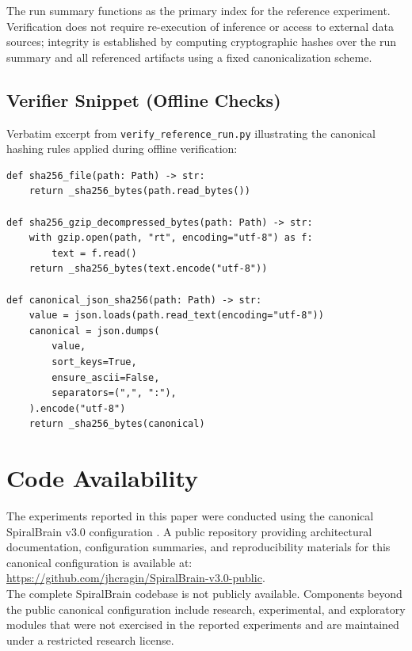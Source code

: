 \documentclass[12pt,a4paper]{article}
\begin{document}
\medskip
\noindent
The run summary functions as the primary index for the reference experiment. Verification does not require re-execution of inference or access to external data sources; integrity is established by computing cryptographic hashes over the run summary and all referenced artifacts using a fixed canonicalization scheme.

\subsection{Verifier Snippet (Offline Checks)}

Verbatim excerpt from \texttt{verify\_reference\_run.py} illustrating the canonical hashing rules applied during offline verification:

\begin{Verbatim}[fontsize=\small,breaklines=true,breakanywhere=true]
def sha256_file(path: Path) -> str:
    return _sha256_bytes(path.read_bytes())

def sha256_gzip_decompressed_bytes(path: Path) -> str:
    with gzip.open(path, "rt", encoding="utf-8") as f:
        text = f.read()
    return _sha256_bytes(text.encode("utf-8"))

def canonical_json_sha256(path: Path) -> str:
    value = json.loads(path.read_text(encoding="utf-8"))
    canonical = json.dumps(
        value,
        sort_keys=True,
        ensure_ascii=False,
        separators=(",", ":"),
    ).encode("utf-8")
    return _sha256_bytes(canonical)
\end{Verbatim}



\section{Code Availability}

The experiments reported in this paper were conducted using the canonical SpiralBrain v3.0 configuration \cite{SpiralBrainV3}.
A public repository providing architectural documentation, configuration summaries, and reproducibility materials for this canonical configuration is available at: \\
\url{https://github.com/jhcragin/SpiralBrain-v3.0-public}. \\

The complete SpiralBrain codebase is not publicly available. Components beyond the public canonical configuration include research, experimental, and exploratory modules that were not exercised in the reported experiments and are maintained under a restricted research license.



\end{document}
